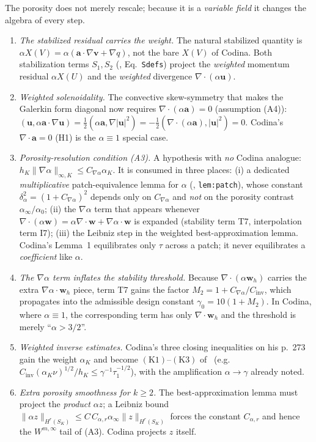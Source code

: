 \documentclass[11pt]{article}
\theoremstyle{remark}
\newcommand{\bu}{\boldsymbol{u}}
\newcommand{\bv}{\boldsymbol{v}}
\newcommand{\bw}{\boldsymbol{w}}
\newcommand{\ba}{\boldsymbol{a}}
\newcommand{\norm}[1]{\lVert #1 \rVert}
\begin{document}
The porosity does not merely rescale; because it is a \emph{variable field} it changes the
algebra of every step.
\begin{enumerate}[leftmargin=1.5em,itemsep=0.3ex]
\item \emph{The stabilized residual carries the weight.} The natural stabilized quantity is
$\alpha X(V)=\alpha(\ba\cdot\nabla\bv+\nabla q)$, not the bare $X(V)$ of Codina. Both
stabilization terms $S_1,S_2$ (\cite{osgsnote}, Eq.~\texttt{Sdefs}) project the
\emph{weighted} momentum residual $\alpha X(U)$ and the \emph{weighted} divergence
$\nabla\cdot(\alpha\bu)$.
\item \emph{Weighted solenoidality.} The convective skew-symmetry that makes the Galerkin
form diagonal now requires $\nabla\cdot(\alpha\ba)=0$ (assumption (A4)):
$(\bu,\alpha\ba\cdot\nabla\bu)=\tfrac12(\alpha\ba,\nabla|\bu|^2)=-\tfrac12(\nabla\cdot(\alpha\ba),|\bu|^2)=0$.
Codina's $\nabla\cdot\ba=0$ (H1) is the $\alpha\equiv1$ special case.
\item \emph{Porosity-resolution condition (A3).} A hypothesis with \emph{no} Codina analogue:
$h_K\norm{\nabla\alpha}_{\infty,K}\le C_{\nabla\alpha}\alpha_K$. It is consumed in three
places: (i) a dedicated \emph{multiplicative} patch-equivalence lemma for $\alpha$
(\cite{osgsnote}, \texttt{lem:patch}), whose constant $\delta_\alpha^2=(1+C_{\nabla\alpha})^2$
depends only on $C_{\nabla\alpha}$ and \emph{not} on the porosity contrast
$\alpha_\infty/\alpha_0$; (ii) the $\nabla\alpha$ term that appears whenever
$\nabla\cdot(\alpha\bw)=\alpha\nabla\cdot\bw+\nabla\alpha\cdot\bw$ is expanded (stability
term T7, interpolation term I7); (iii) the Leibniz step in the weighted best-approximation
lemma. Codina's Lemma~1 equilibrates only $\tau$ across a patch; it never equilibrates a
\emph{coefficient} like $\alpha$.
\item \emph{The $\nabla\alpha$ term inflates the stability threshold.} Because
$\nabla\cdot(\alpha\bw_h)$ carries the extra $\nabla\alpha\cdot\bw_h$ piece, term T7 gains
the factor $M_2=1+C_{\nabla\alpha}/C_{\mathrm{inv}}$, which propagates into the admissible
design constant $\gamma_0=10(1+M_2)$. In Codina, where $\alpha\equiv1$, the corresponding
term has only $\nabla\cdot\bw_h$ and the threshold is merely ``$\alpha>3/2$''.
\item \emph{Weighted inverse estimates.} Codina's three closing inequalities on his p.~273 gain
the weight $\alpha_K$ and become $\mathrm{(K1)}$--$\mathrm{(K3)}$ of~\cite{osgsnote}
(e.g.\ $C_{\mathrm{inv}}(\alpha_K\nu)^{1/2}/h_K\le\gamma^{-1}\tau_1^{-1/2}$), with the
amplification $\alpha\to\gamma$ already noted.
\item \emph{Extra porosity smoothness for $k\ge2$.} The best-approximation lemma must project the
\emph{product} $\alpha z$; a Leibniz bound $\norm{\alpha z}_{H^r(S_K)}\le
C\,C_{\alpha,r}\alpha_{\infty}\norm{z}_{H^r(S_K)}$ forces the constant $C_{\alpha,r}$ and
hence the $W^{m,\infty}$ tail of (A3). Codina projects $z$ itself.
\end{enumerate}
\end{document}
